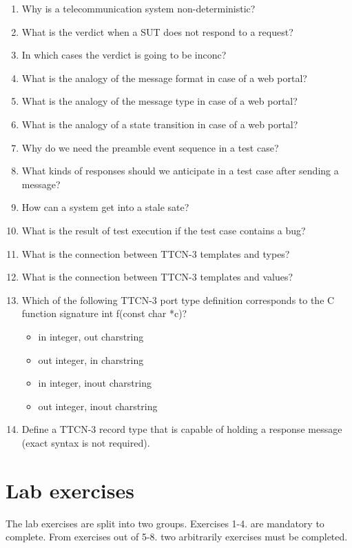 \documentclass[a4paper]{article}
\begin{document}
\begin{enumerate}

  \item  Why is a telecommunication system non-deterministic?
  \item  What is the verdict when a SUT does not respond to a request?
  \item  In which cases the verdict is going to be inconc?
  \item  What is the analogy of the message format in case of a web portal?
  \item  What is the analogy of the message type in case of a web portal?
  \item  What is the analogy of a state transition in case of a web portal?
  \item  Why do we need the preamble event sequence in a test case?
  \item  What kinds of responses should we anticipate in a test case after sending a message?
  \item  How can a system get into a stale sate?
  \item  What is the result of test execution if the test case contains a bug?
  \item  What is the connection between TTCN-3 templates and types?
  \item  What is the connection between TTCN-3 templates and values?
  \item Which of the following TTCN-3 port type definition corresponds to the C function signature int f(const char *c)?
  \begin{itemize}
    \item in integer, out charstring
    \item out integer, in charstring
    \item in integer, inout charstring
    \item out integer, inout charstring 
  \end{itemize}
  \item  Define a TTCN-3 record type that is capable of holding a response message (exact syntax is not required).
\end{enumerate}

\section{Lab exercises}

The lab exercises are split into two groups. Exercises 1-4. are mandatory to complete. From exercises out of 5-8. two arbitrarily exercises must be completed.
\end{document}
